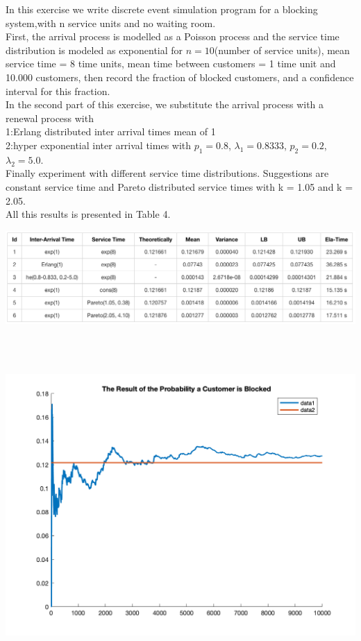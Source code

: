 In this exercise we write discrete event simulation program for a blocking system,with n service units and no waiting room.\\
First, the arrival process is modelled as a Poisson process and the service time distribution is modeled as exponential for $n = 10$(number of service units), mean service time = 8 time units, mean time between customers = 1 time unit and 10.000 customers, then record the fraction of blocked customers, and a confidence
interval for this fraction.\\
In the second part of this exercise, we substitute the arrival process with a renewal process with\\
1:Erlang distributed inter arrival times mean of 1\\
2:hyper exponential inter arrival times with $p_1 = 0.8$, $\lambda_1 = 0.8333$, $p_2 = 0.2$, $\lambda_2 = 5.0$.\\
Finally experiment with different service time distributions.
Suggestions are constant service time and Pareto distributed service times with k = 1.05 and k = 2.05.\\
All this results is presented in Table 4.\\

\begin{center}
    \includegraphics[scale=0.5]{Figures/figure4_1.png}\\
\end{center}\\
\\
\begin{center}
    \includegraphics[scale=0.4]{Figures/figure4_2.png}\\
\end{center}\\
\\


